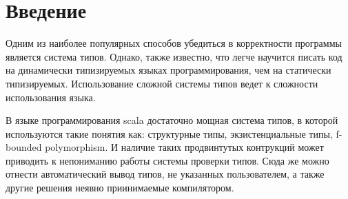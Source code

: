 \documentclass{spbau-diploma}
\begin{document}
\maketitle
\tableofcontents

\section*{Введение}
Одним из наиболее популярных способов убедиться в корректности программы
является система типов.
Однако, также известно, что легче научится писать код на динамически типизируемых
языках программирования, чем на статически типизируемых.
Использование сложной системы типов ведет к сложности использования языка.

В языке программирования scala достаточно мощная система типов,
в которой используются такие понятия как: структурные типы, экзистенциальные
типы, f-bounded polymorphism.
И наличие таких продвинтутых контрукций может приводить к непониманию работы
системы проверки типов.
Сюда же можно отнести автоматический вывод типов, не указанных пользователем,
а также другие решения неявно приинимаемые компилятором.
\end{document}

